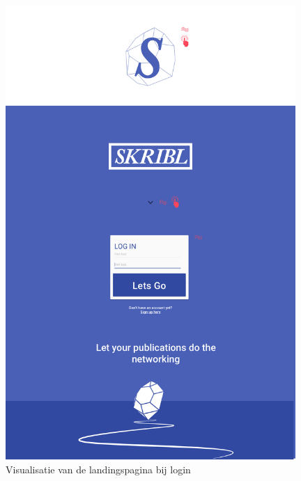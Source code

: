 \documentclass{article}
\begin{document}
\begin{appendices}
\clearpage

\begin{figure}[!h]
\centering
 \includegraphics[width=110mm]{pieteruploads/SKRBL_FRNT_Homeafterlogin.png}
 \caption{Visualisatie van de landingspagina bij login}
\end{figure}
\clearpage


\end{appendices}
\end{document}
